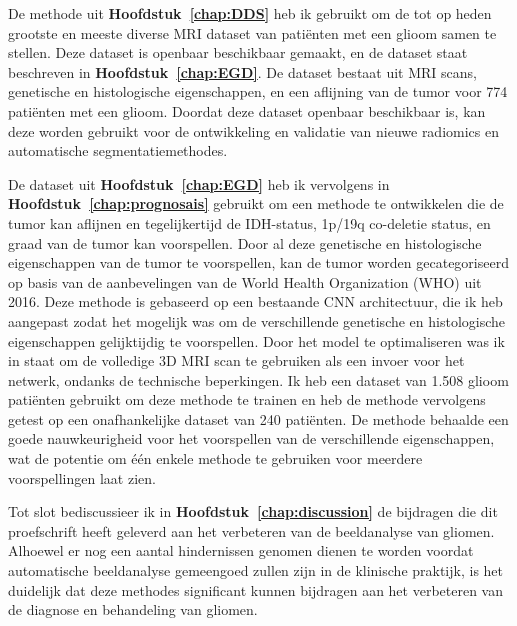 De methode uit \textbf{Hoofdstuk~\ref{chap:DDS}} heb ik gebruikt om de tot op heden grootste en meeste diverse MRI dataset van pati{\"e}nten met een glioom samen te stellen.
Deze dataset is openbaar beschikbaar gemaakt, en de dataset staat beschreven in \textbf{Hoofdstuk~\ref{chap:EGD}}.
De dataset bestaat uit MRI scans, genetische en histologische eigenschappen, en een aflijning van de tumor voor 774 pati{\"e}nten met een glioom.
Doordat deze dataset openbaar beschikbaar is, kan deze worden gebruikt voor de ontwikkeling en validatie van nieuwe radiomics en automatische segmentatiemethodes.

De dataset uit \textbf{Hoofdstuk~\ref{chap:EGD}}  heb ik vervolgens in \textbf{Hoofdstuk~\ref{chap:prognosais}} gebruikt om een methode te ontwikkelen die de tumor kan aflijnen en tegelijkertijd de IDH-status, 1p/19q co-deletie status, en graad van de tumor kan voorspellen.
Door al deze genetische en histologische eigenschappen van de tumor te voorspellen, kan de tumor worden gecategoriseerd op basis van de aanbevelingen van de World Health Organization (WHO) uit 2016.
Deze methode is gebaseerd op een bestaande CNN architectuur, die ik heb aangepast zodat het mogelijk was om de verschillende genetische en histologische eigenschappen gelijktijdig te voorspellen.
Door het model te optimaliseren was ik in staat om de volledige 3D MRI scan te gebruiken als een invoer voor het netwerk, ondanks de technische beperkingen.
Ik heb een dataset van 1.508 glioom pati{\"e}nten gebruikt om deze methode te trainen en heb de methode vervolgens getest op een onafhankelijke dataset van 240 pati{\"e}nten.
De methode behaalde een goede nauwkeurigheid voor het voorspellen van de verschillende eigenschappen, wat de potentie om {\'e}{\'e}n enkele methode te gebruiken voor meerdere voorspellingen laat zien.

Tot slot bediscussieer ik in \textbf{Hoofdstuk~\ref{chap:discussion}} de bijdragen die dit proefschrift heeft geleverd aan het verbeteren van de beeldanalyse van gliomen.
Alhoewel er nog een aantal hindernissen genomen dienen te worden voordat automatische beeldanalyse gemeengoed zullen zijn in de klinische praktijk, is het duidelijk dat deze methodes significant kunnen bijdragen aan het verbeteren van de diagnose en behandeling van gliomen.



